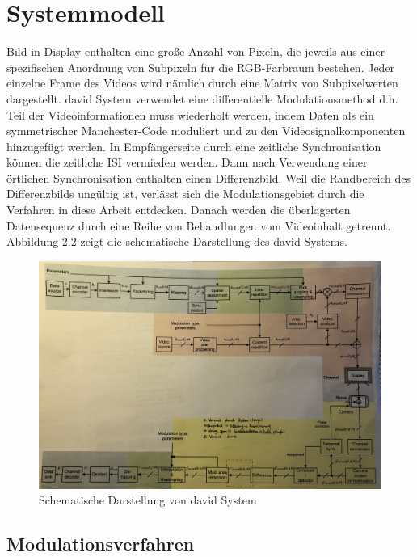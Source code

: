 \section{Systemmodell} 
Bild in Display enthalten eine große Anzahl von Pixeln, die jeweils aus einer spezifischen Anordnung von Subpixeln für die RGB-Farbraum bestehen. Jeder einzelne Frame des Videos wird nämlich durch eine Matrix von Subpixelwerten dargestellt. \gls{david} System verwendet eine differentielle Modulationsmethod d.h. Teil der Videoinformationen muss wiederholt werden, indem Daten als ein symmetrischer Manchester-Code moduliert und zu den Videosignalkomponenten hinzugefügt werden. In Empfängerseite durch eine zeitliche Synchronisation können die zeitliche \gls{ISI} vermieden werden. Dann nach Verwendung einer örtlichen Synchronisation enthalten einen Differenzbild. Weil die Randbereich des Differenzbilds ungültig ist, verlässt sich die Modulationsgebiet durch die Verfahren in diese Arbeit entdecken. Danach werden die überlagerten Datensequenz durch eine Reihe von Behandlungen vom Videoinhalt getrennt. Abbildung 2.2 zeigt die schematische Darstellung des \gls{david}-Systems. 
\vspace{18pt}

\begin{figure}[htb]
	\centering 
	\includegraphics[keepaspectratio,width=1.0\textwidth]{images/2_DaViD/David3.jpg}
	\caption{Schematische Darstellung von \gls{david} System}
	\label{fig:David2}
\end{figure}


\subsection{Modulationsverfahren}

